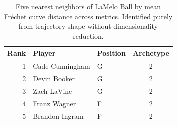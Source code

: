 \begin{table}[htbp]
  \centering\small
  \begin{tabular}{rllc}
    \toprule
    Rank & Player & Position & Archetype \\
    \midrule
    1 & Cade Cunningham & G & 2 \\
    2 & Devin Booker & G & 2 \\
    3 & Zach LaVine & G & 2 \\
    4 & Franz Wagner & F & 2 \\
    5 & Brandon Ingram & F & 2 \\
    \bottomrule
  \end{tabular}
  \caption{Five nearest neighbors of LaMelo Ball by mean Fr\'{e}chet curve distance across metrics. Identified purely from trajectory shape without dimensionality reduction.}
  \label{tab:LaMelo_Ball_frechet_curve_neighbors}
\end{table}

